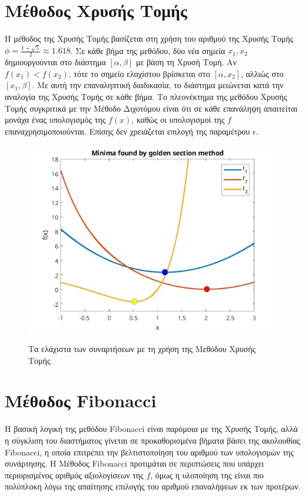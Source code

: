 \section{Μέθοδος Χρυσής Τομής}
Η μέθοδος της Χρυσής Τομής βασίζεται στη χρήση του αριθμού της Χρυσής Τομής $\phi = \frac{1 + \sqrt{5}}{2} \approx 1.618$. Σε κάθε βήμα της μεθόδου, δύο νέα σημεία $x_1, x_2$ δημιουργούνται στο διάστημα $[\alpha, \beta]$ με βάση τη Χρυσή Τομή. Αν $f(x_1) < f(x_2)$, τότε το σημείο ελαχίστου βρίσκεται στο $[\alpha, x_2]$, αλλιώς στο $[x_1, \beta]$. Με αυτή την επαναληπτική διαδικασία, το διάστημα μειώνεται κατά την αναλογία της Χρυσής Τομής σε κάθε βήμα. Το πλεονέκτημα της μεθόδου Χρυσής Τομής συγκριτικά με την Μέθοδο Διχοτόμου είναι ότι σε κάθε επανάληψη απαιτείται μονάχα ένας υπολογισμός της $f(x)$, καθώς οι υπολογισμοί της $f$ επαναχρησιμοποιούνται. Επίσης δεν χρειάζεται επιλογή της παραμέτρου $\epsilon$.

\begin{figure}[H]
    \includegraphics[scale=0.7]{plots/prereqs/gs.jpg}
    \label{fig:funcs}
    \caption{Τα ελάχιστα των συναρτήσεων με τη χρήση της Μεθόδου Χρυσής Τομής}
    \centering
\end{figure}

\section{Μέθοδος  Fibonacci }
Η βασική λογική της μεθόδου Fibonacci είναι παρόμοια με της Χρυσής Τομής, αλλά η σύγκλιση του διαστήματος γίνεται σε προκαθορισμένα βήματα βάσει της ακολουθίας Fibonacci, η οποία επιτρέπει την βελτιστοποίηση του αριθμού των υπολογισμών της συνάρτησης. Η Μέθοδος Fibonacci προτιμάται σε περιπτώσεις που υπάρχει περιορισμένος αριθμός αξιολογίσεων της $f$, όμως η υλοποίηση της είναι πιο πολύπλοκη λόγω της απαίτησης επιλογής του αριθμού επαναλήψεων εκ των προτέρων.

